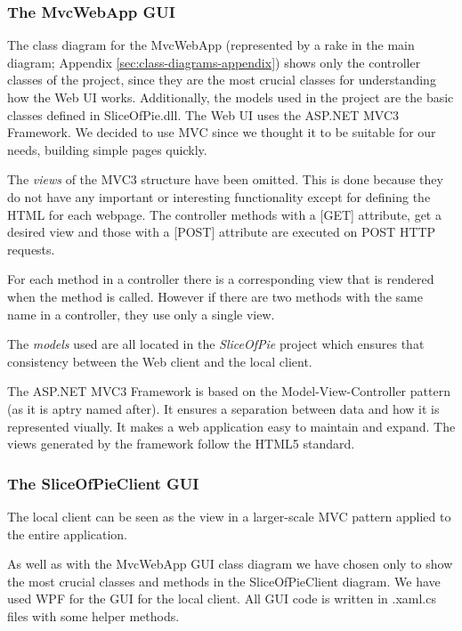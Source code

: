 \subsubsection{The MvcWebApp GUI}

The class diagram for the MvcWebApp (represented by a rake in the main diagram; Appendix \ref{sec:class-diagrams-appendix}) shows only the controller
classes of the project, since they are the most crucial classes for understanding how the Web UI works. Additionally, the models used in the project
are the basic classes defined in SliceOfPie.dll. The Web UI uses the ASP.NET MVC3 Framework. We decided to use MVC since we thought it to be suitable
for our needs, building simple pages quickly.

The \emph{views} of the MVC3 structure have been omitted. This is done because they do not have any important or interesting functionality except for
defining the HTML for each webpage. The controller methods with a [GET] attribute, get a desired view and those with a [POST] attribute are executed on
POST HTTP requests.

For each method in a controller there is a corresponding view that is rendered when the method is called. However if there are two methods with the same 
name in a controller, they use only a single view.

The \emph{models} used are all located in the \emph{SliceOfPie} project which ensures that consistency between the Web client and the local client.

The ASP.NET MVC3 Framework is based on the Model-View-Controller pattern (as it is aptry named after). It ensures a separation between data and how
it is represented viually. It makes a web application easy to maintain and expand. The views generated by the framework follow the HTML5 standard.

\subsubsection{The SliceOfPieClient GUI}

The local client can be seen as the view in a larger-scale MVC pattern applied to the entire application.

As well as with the MvcWebApp GUI class diagram we have chosen only to show the most crucial classes and methods in the SliceOfPieClient diagram.
We have used WPF for the GUI for the local client. All GUI code is written in .xaml.cs files with some helper methods.


